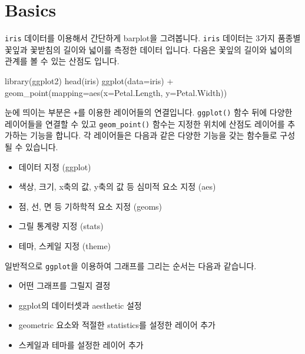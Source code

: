 \documentclass[
]{book}
\newenvironment{Shaded}{\begin{snugshade}}{\end{snugshade}}
\newcommand{\AttributeTok}[1]{\textcolor[rgb]{0.77,0.63,0.00}{#1}}
\newcommand{\FunctionTok}[1]{\textcolor[rgb]{0.00,0.00,0.00}{#1}}
\newcommand{\NormalTok}[1]{#1}
\newcommand{\SpecialCharTok}[1]{\textcolor[rgb]{0.00,0.00,0.00}{#1}}
\providecommand{\tightlist}{%
  \setlength{\itemsep}{0pt}\setlength{\parskip}{0pt}}
\begin{document}
\hypertarget{basics}{%
\section{Basics}\label{basics}}

\texttt{iris} 데이터를 이용해서 간단하게 barplot을 그려봅니다. \texttt{iris} 데이터는 3가지 품종별 꽃잎과 꽃받침의 길이와 넓이를 측정한 데이터 입니다. 다음은 꽃잎의 길이와 넓이의 관계를 볼 수 있는 산점도 입니다.

\begin{Shaded}
\begin{Highlighting}[]
\FunctionTok{library}\NormalTok{(ggplot2)}
\FunctionTok{head}\NormalTok{(iris)}
\FunctionTok{ggplot}\NormalTok{(}\AttributeTok{data=}\NormalTok{iris) }\SpecialCharTok{+}
  \FunctionTok{geom\_point}\NormalTok{(}\AttributeTok{mapping=}\FunctionTok{aes}\NormalTok{(}\AttributeTok{x=}\NormalTok{Petal.Length, }\AttributeTok{y=}\NormalTok{Petal.Width))}
\end{Highlighting}
\end{Shaded}

눈에 띄이는 부분은 \texttt{+}를 이용한 레이어들의 연결입니다. \texttt{ggplot()} 함수 뒤에 다양한 레이어들을 연결할 수 있고 \texttt{geom\_point()} 함수는 지정한 위치에 산점도 레이어를 추가하는 기능을 합니다. 각 레이어들은 다음과 같은 다양한 기능을 갖는 함수들로 구성될 수 있습니다.

\begin{itemize}
\tightlist
\item
  데이터 지정 (ggplot)
\item
  색상, 크기, x축의 값, y축의 값 등 심미적 요소 지정 (aes)
\item
  점, 선, 면 등 기하학적 요소 지정 (geoms)
\item
  그릴 통계량 지정 (stats)
\item
  테마, 스케일 지정 (theme)
\end{itemize}

일반적으로 \texttt{ggplot}을 이용하여 그래프를 그리는 순서는 다음과 같습니다.

\begin{itemize}
\tightlist
\item
  어떤 그래프를 그릴지 결정
\item
  ggplot의 데이터셋과 aesthetic 설정
\item
  geometric 요소와 적절한 statistics를 설정한 레이어 추가
\item
  스케일과 테마를 설정한 레이어 추가
\end{itemize}
\end{document}
